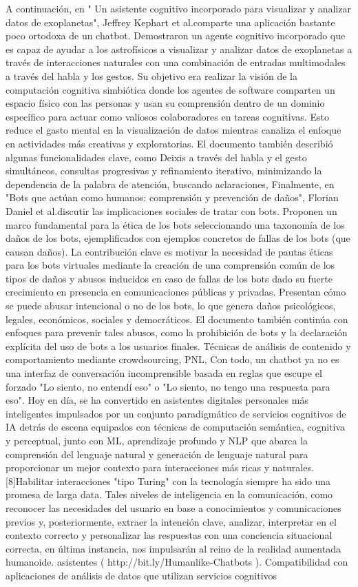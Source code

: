A continuación, en " Un asistente cognitivo incorporado para visualizar y analizar datos de exoplanetas", Jeffrey Kephart et al.comparte una aplicación bastante poco ortodoxa de un chatbot. Demostraron un agente cognitivo incorporado que es capaz de ayudar a los astrofísicos a visualizar y analizar datos de exoplanetas a través de interacciones naturales con una combinación de entradas multimodales a través del habla y los gestos. Su objetivo era realizar la visión de la computación cognitiva simbiótica donde los agentes de software comparten un espacio físico con las personas y usan su comprensión dentro de un dominio específico para actuar como valiosos colaboradores en tareas cognitivas. Esto reduce el gasto mental en la visualización de datos mientras canaliza el enfoque en actividades más creativas y exploratorias. El documento también describió algunas funcionalidades clave, como Deixis a través del habla y el gesto simultáneos, consultas progresivas y refinamiento iterativo, minimizando la dependencia de la palabra de atención, buscando aclaraciones,
Finalmente, en "Bots que actúan como humanos: comprensión y prevención de daños", Florian Daniel et al.discutir las implicaciones sociales de tratar con bots. Proponen un marco fundamental para la ética de los bots seleccionando una taxonomía de los daños de los bots, ejemplificados con ejemplos concretos de fallas de los bots (que causan daños). La contribución clave es motivar la necesidad de pautas éticas para los bots virtuales mediante la creación de una comprensión común de los tipos de daños y abusos inducidos en caso de fallas de los bots dado su fuerte crecimiento en presencia en comunicaciones públicas y privadas. Presentan cómo se puede abusar intencional o no de los bots, lo que genera daños psicológicos, legales, económicos, sociales y democráticos. El documento también continúa con enfoques para prevenir tales abusos, como la prohibición de bots y la declaración explícita del uso de bots a los usuarios finales. Técnicas de análisis de contenido y comportamiento mediante crowdsourcing, PNL,
Con todo, un chatbot ya no es una interfaz de conversación incomprensible basada en reglas que escupe el forzado "Lo siento, no entendí eso" o "Lo siento, no tengo una respuesta para eso". Hoy en día, se ha convertido en asistentes digitales personales más inteligentes impulsados por un conjunto paradigmático de servicios cognitivos de IA detrás de escena equipados con técnicas de computación semántica, cognitiva y perceptual, junto con ML, aprendizaje profundo y NLP que abarca la comprensión del lenguaje natural y generación de lenguaje natural para proporcionar un mejor contexto para interacciones más ricas y naturales. [8]Habilitar interacciones "tipo Turing" con la tecnología siempre ha sido una promesa de larga data. Tales niveles de inteligencia en la comunicación, como reconocer las necesidades del usuario en base a conocimientos y comunicaciones previos y, posteriormente, extraer la intención clave, analizar, interpretar en el contexto correcto y personalizar las respuestas con una conciencia situacional correcta, en última instancia, nos impulsarán al reino de la realidad aumentada humanoide. asistentes ( http://bit.ly/Humanlike-Chatbots ).
Compatibilidad con aplicaciones de análisis de datos que utilizan servicios cognitivos
 
